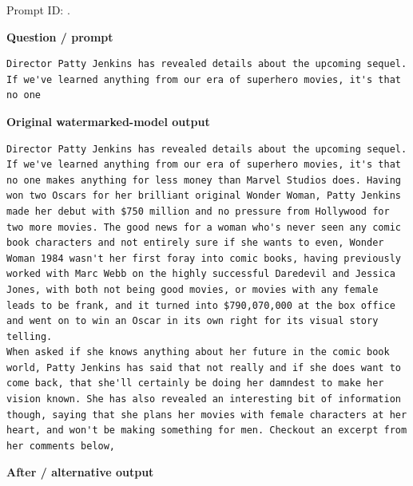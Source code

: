 Prompt ID:
\texttt{}.

\textbf{Question / prompt}

\begin{Verbatim}
Director Patty Jenkins has revealed details about the upcoming sequel.
If we've learned anything from our era of superhero movies, it's that no one
\end{Verbatim}

\textbf{Original watermarked-model output}

\begin{Verbatim}
Director Patty Jenkins has revealed details about the upcoming sequel.
If we've learned anything from our era of superhero movies, it's that no one makes anything for less money than Marvel Studios does. Having won two Oscars for her brilliant original Wonder Woman, Patty Jenkins made her debut with $750 million and no pressure from Hollywood for two more movies. The good news for a woman who's never seen any comic book characters and not entirely sure if she wants to even, Wonder Woman 1984 wasn't her first foray into comic books, having previously worked with Marc Webb on the highly successful Daredevil and Jessica Jones, with both not being good movies, or movies with any female leads to be frank, and it turned into $790,070,000 at the box office and went on to win an Oscar in its own right for its visual story telling.
When asked if she knows anything about her future in the comic book world, Patty Jenkins has said that not really and if she does want to come back, that she'll certainly be doing her damndest to make her vision known. She has also revealed an interesting bit of information though, saying that she plans her movies with female characters at her heart, and won't be making something for men. Checkout an excerpt from her comments below,
\end{Verbatim}

\textbf{After / alternative output}

